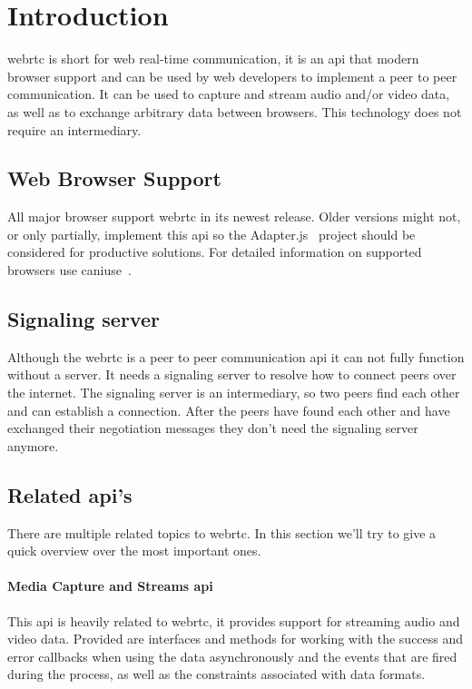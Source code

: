 \clearpage
\chapter{Introduction}
\Gls{webrtc} is short for web real-time communication, it is an \Gls{api} that modern browser support and can be used by web developers to implement a peer to peer communication. It can be used to capture and stream audio and/or video data, as well as to exchange arbitrary data between browsers. This technology does not require an intermediary.

\section{Web Browser Support}
All major browser support \Gls{webrtc} in its newest release. Older versions might not, or only partially, implement this \Gls{api} so the Adapter.js~\autocite{adapterjs} project should be considered for productive solutions. For detailed information on supported browsers use caniuse~\autocite{caniuse}.

\section{Signaling server}
Although the \Gls{webrtc} is a peer to peer communication \Gls{api} it can not fully function without a server. It needs a signaling server to resolve how to connect peers over the internet. The signaling server is an intermediary, so two peers find each other and can establish a connection. After the peers have found each other and have exchanged their negotiation messages they don't need the signaling server anymore.

\section{Related \Gls{api}'s}
There are multiple related topics to \Gls{webrtc}. In this section we'll try to give a quick overview over the most important ones.

\subsubsection{Media Capture and Streams \Gls{api}}
This \Gls{api} is heavily related to \Gls{webrtc}, it provides support for streaming audio and video data. Provided are interfaces and methods for working with the success and error callbacks when using the data asynchronously and the events that are fired during the process, as well as the constraints associated with data formats.